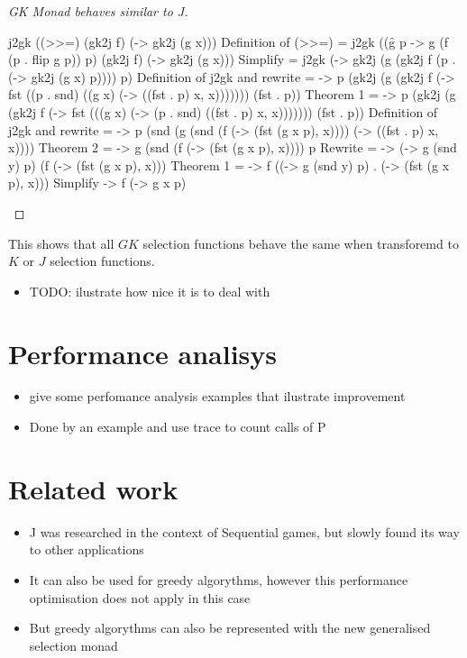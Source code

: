 \documentclass[runningheads]{llncs}
\providecommand{\tightlist}{%
  \setlength{\itemsep}{0pt}\setlength{\parskip}{0pt}}
\begin{document}
\begin{proof}[GK Monad behaves similar to J]\\
\begin{haskell}
j2gk ((>>=) (gk2j f) (\x -> gk2j (g x)))                                                         
{{ Definition of (>>=) }}
= j2gk ((\f g p -> g (f (p . flip g p)) p) (gk2j f) (\x -> gk2j (g x)))
{{ Simplify }}
= j2gk (\p -> gk2j (g (gk2j f (p . (\x -> gk2j (g x) p)))) p)
{{ Definition of j2gk and rewrite }}
= \p -> p (gk2j (g (gk2j f (\x -> fst ((p . snd) ((g x) (\x -> ((fst . p) x, x))))))) (fst . p))
{{ Theorem 1 }}
= \p -> p (gk2j (g (gk2j f (\x -> fst (((g x) (\x -> (p . snd) ((fst . p) x, x))))))) (fst . p))
{{Definition of j2gk and rewrite }}                  
= \p -> p (snd (g (snd (f (\x -> (fst (g x p), x)))) (\x -> ((fst . p) x, x))))
{{ Theorem 2 }}
= \p -> g (snd (f (\x -> (fst (g x p), x)))) p
{{ Rewrite }}
= \p -> (\y -> g (snd y) p) (f (\x -> (fst (g x p), x)))
{{ Theorem 1 }}
= \p -> f ((\y -> g (snd y) p) . (\x -> (fst (g x p), x)))  
{{ Simplify }}
\p -> f (\x -> g x p)
\end{haskell}
\end{proof}

This shows that all \(GK\) selection functions behave the same when
transforemd to \(K\) or \(J\) selection functions.

\begin{itemize}
\tightlist
\item
  TODO: ilustrate how nice it is to deal with
\end{itemize}

\section{Performance analisys}\label{performance-analisys}

\begin{itemize}
\tightlist
\item
  give some perfomance analysis examples that ilustrate improvement
\item
  Done by an example and use trace to count calls of P
\end{itemize}

\section{Related work}\label{related-work}

\begin{itemize}
\item
  J was researched in the context of Sequential games, but slowly found
  its way to other applications
\item
  It can also be used for greedy algorythms, however this performance
  optimisation does not apply in this case
\item
  But greedy algorythms can also be represented with the new generalised
  selection monad
\end{itemize}
\end{document}
